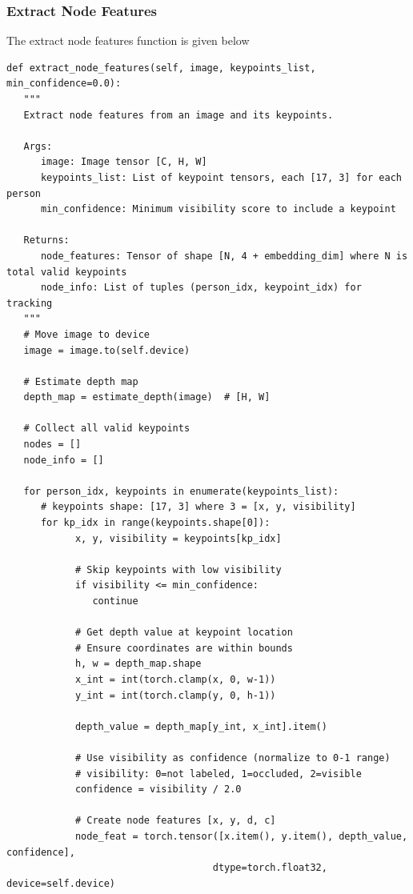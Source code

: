 \subsubsection{Extract Node Features}

The extract node features function is given below

\begin{lstlisting}[style=pythonstyle,title={Preprocessing May Extract Node Features},label={code:preprocessing_may_extract_node_features}]
def extract_node_features(self, image, keypoints_list, min_confidence=0.0):
   """
   Extract node features from an image and its keypoints.
   
   Args:
      image: Image tensor [C, H, W]
      keypoints_list: List of keypoint tensors, each [17, 3] for each person
      min_confidence: Minimum visibility score to include a keypoint
      
   Returns:
      node_features: Tensor of shape [N, 4 + embedding_dim] where N is total valid keypoints
      node_info: List of tuples (person_idx, keypoint_idx) for tracking
   """
   # Move image to device
   image = image.to(self.device)
   
   # Estimate depth map
   depth_map = estimate_depth(image)  # [H, W]
   
   # Collect all valid keypoints
   nodes = []
   node_info = []
   
   for person_idx, keypoints in enumerate(keypoints_list):
      # keypoints shape: [17, 3] where 3 = [x, y, visibility]
      for kp_idx in range(keypoints.shape[0]):
            x, y, visibility = keypoints[kp_idx]
            
            # Skip keypoints with low visibility
            if visibility <= min_confidence:
               continue
            
            # Get depth value at keypoint location
            # Ensure coordinates are within bounds
            h, w = depth_map.shape
            x_int = int(torch.clamp(x, 0, w-1))
            y_int = int(torch.clamp(y, 0, h-1))
            
            depth_value = depth_map[y_int, x_int].item()
            
            # Use visibility as confidence (normalize to 0-1 range)
            # visibility: 0=not labeled, 1=occluded, 2=visible
            confidence = visibility / 2.0
            
            # Create node features [x, y, d, c]
            node_feat = torch.tensor([x.item(), y.item(), depth_value, confidence], 
                                    dtype=torch.float32, device=self.device)
            

\end{lstlisting}
